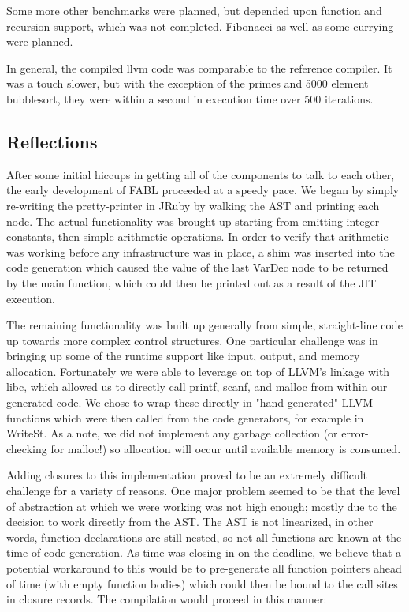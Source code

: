 \documentclass[11pt]{article} %
\begin{document}
Some more other benchmarks were planned, but depended upon function and recursion support, which was not completed. Fibonacci as well as some currying were planned.

In general, the compiled llvm code was comparable to the reference compiler. It was a touch slower, but with the exception of the primes and 5000 element bubblesort, they were within a second in execution time over 500 iterations.


\subsection{Reflections}

After some initial hiccups in getting all of the components to talk to each other, the early development of FABL proceeded at a speedy pace. We began by simply re-writing the pretty-printer in JRuby by walking the AST and printing each node. The actual functionality was brought up starting from emitting integer constants, then simple arithmetic operations. In order to verify that arithmetic was working before any infrastructure was in place, a shim was inserted into the code generation which caused the value of the last VarDec node to be returned by the main function, which could then be printed out as a result of the JIT execution. 

The remaining functionality was built up generally from simple, straight-line code up towards more complex control structures. One particular challenge was in bringing up some of the runtime support like input, output, and memory allocation. Fortunately we were able to leverage on top of LLVM's linkage with libc, which allowed us to directly call printf, scanf, and malloc from within our generated code. We chose to wrap these directly in "hand-generated" LLVM functions which were then called from the code generators, for example in WriteSt. As a note, we did not implement any garbage collection (or error-checking for malloc!) so allocation will occur until available memory is consumed.

Adding closures to this implementation proved to be an extremely difficult challenge for a variety of reasons. One major problem seemed to be that the level of abstraction at which we were working was not high enough; mostly due to the decision to work directly from the AST. The AST is not linearized, in other words, function declarations are still nested, so not all functions are known at the time of code generation. As time was closing in on the deadline, we believe that a potential workaround to this would be to pre-generate all function pointers ahead of time (with empty function bodies) which could then be bound to the call sites in closure records. The compilation would proceed in this manner:
\end{document}
